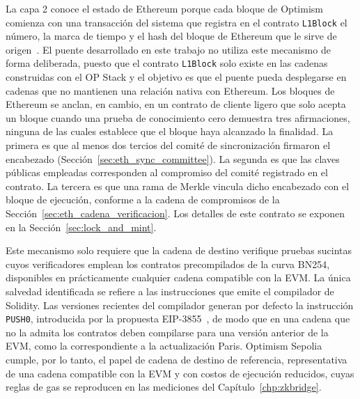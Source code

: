 La capa 2 conoce el estado de Ethereum porque cada bloque de Optimism comienza con una
transacción del sistema que registra en el contrato \texttt{L1Block} el número, la marca de
tiempo y el hash del bloque de Ethereum que le sirve de origen~\cite{opspecspredeploys}. El
puente desarrollado en este trabajo no utiliza este mecanismo de forma deliberada, puesto que el
contrato \texttt{L1Block} solo existe en las cadenas construidas con el OP Stack y el objetivo es
que el puente pueda desplegarse en cadenas que no mantienen una relación nativa con Ethereum. Los
bloques de Ethereum se anclan, en cambio, en un contrato de cliente ligero que solo acepta un
bloque cuando una prueba de conocimiento cero demuestra tres afirmaciones, ninguna de las cuales
establece que el bloque haya alcanzado la finalidad. La primera es que al
menos dos tercios del comité de sincronización firmaron el encabezado
(Sección~\ref{sec:eth_sync_committee}). La segunda es que las claves públicas empleadas
corresponden al compromiso del comité registrado en el contrato. La tercera es que una rama de
Merkle vincula dicho encabezado con el bloque de ejecución, conforme a la cadena de
compromisos de la Sección~\ref{sec:eth_cadena_verificacion}. Los detalles de este contrato se
exponen en la Sección~\ref{sec:lock_and_mint}.

Este mecanismo solo requiere que la cadena de destino verifique pruebas sucintas cuyos
verificadores emplean los contratos precompilados de la curva BN254, disponibles en
prácticamente cualquier cadena compatible con la EVM. La única salvedad identificada se refiere
a las instrucciones que emite el compilador de Solidity. Las versiones recientes del compilador
generan por defecto la instrucción \texttt{PUSH0}, introducida por la propuesta
EIP-3855~\cite{eip3855}, de modo que en una cadena que no la admita los contratos deben
compilarse para una versión anterior de la EVM, como la correspondiente a la actualización
Paris. Optimism Sepolia cumple, por lo tanto, el papel de cadena de destino de referencia,
representativa de una cadena compatible con la EVM y con costos de ejecución reducidos, cuyas
reglas de gas se reproducen en las mediciones del Capítulo~\ref{chp:zkbridge}.
